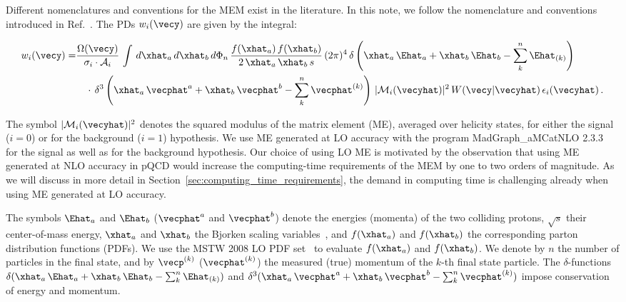 Different nomenclatures and conventions for the MEM exist in the literature.
In this note, we follow the nomenclature and conventions introduced in Ref.~\cite{Volobouev:2011vb}.
The PDs $w_{i}(\vecy)$ are given by the integral:
\begin{linenowrapper}
\begin{align}
w_{i}(\vecy) = & \frac{\Omega(\vecy)}{\sigma_{i} \cdot \mathcal{A}_{i}} \, \int \, d\xhat_{a} \, d\xhat_{b} \,
  d\Phi_{n} \, \frac{f(\xhat_{a}) \, f(\xhat_{b})}{2 \, \xhat_{a} \, \xhat_{b} \, s} \, (2\pi)^{4} \,
  \delta\left( \xhat_{a} \, \Ehat_{a} + \xhat_{b} \, \Ehat_{b} - \sum_{k}^{n} \Ehat_{(k)} \right) \nonumber \\
 & \quad \cdot \, \delta^{3}\left( \xhat_{a} \, \vecphat^{a} + \xhat_{b} \, \vecphat^{b} - \sum_{k}^{n} \vecphat^{(k)}\right) \, 
  \vert \mathcal{M}_{i}(\vecyhat) \vert^{2} \, W(\vecy|\vecyhat) \, \epsilon_{i}(\vecyhat) \, .
\label{eq:mem1}
\end{align}
\end{linenowrapper}
The symbol $\vert \mathcal{M}_{i}(\vecyhat) \vert^{2}$ denotes the squared modulus of the matrix element (ME),
averaged over helicity states,
for either the signal ($i=0$) or for the background ($i=1$) hypothesis.
We use ME generated at LO accuracy with the program MadGraph\_aMCatNLO 2.3.3~\cite{MadGraph_aMCatNLO} for the signal as well as for the background hypothesis.
Our choice of using LO ME is motivated by the observation that using ME generated at NLO accuracy in pQCD
would increase the computing-time requirements of the MEM by one to two orders of magnitude. 
As we will discuss in more detail in Section~\ref{sec:computing_time_requirements}, the demand in computing time is challenging already when using ME generated at LO accuracy.

The symbols $\Ehat_{a}$ and $\Ehat_{b}$ ($\vecphat^{a}$ and $\vecphat^{b}$) denote the energies (momenta) of the two colliding protons,
$\sqrt{s}$ their center-of-mass energy,
$\xhat_{a}$ and $\xhat_{b}$ the Bjorken scaling variables~\cite{Bjorkenx},
and $f(\xhat_{a})$ and $f(\xhat_{b})$ the corresponding parton distribution functions (PDFs).
We use the MSTW 2008 LO PDF set~\cite{MSTW} to evaluate $f(\xhat_{a})$ and $f(\xhat_{b})$.
We denote by $n$ the number of particles in the final state,
and by $\vecp^{(k)}$ ($\vecphat^{(k)}$) the measured (true) momentum of the $k$-th final state particle. 
The $\delta$-functions $\delta( \xhat_{a} \, \Ehat_{a} + \xhat_{b} \, \Ehat_{b} - \sum_{k}^{n} \Ehat_{(k)})$
and $\delta^{3}( \xhat_{a} \, \vecphat^{a} + \xhat_{b} \, \vecphat^{b} - \sum_{k}^{n} \vecphat^{(k)})$ 
impose conservation of energy and momentum.

